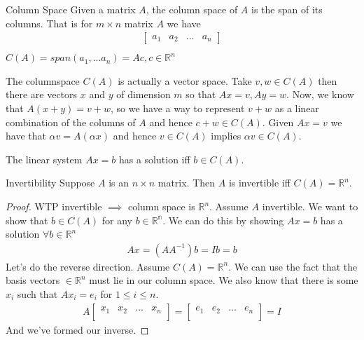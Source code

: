 \documentclass[11pt]{article}
\begin{document}
\begin{definitionbox}{Column Space}
    Given a matrix $A$, the column space of $A$ is the span of its columns. That is for $m \times n$
    matrix $A$ we have
    \begin{align*}
        \begin{bmatrix}
            a_1 & a_2 & ... & a_n
        \end{bmatrix} \\
    \end{align*}
    $C(A)=span({a_1,...a_n})={Ac, c \in \mathbb{R}^n}$
\end{definitionbox}

The columnspace $C(A)$ is actually a vector space. Take $v,w \in C(A)$ then there are vectors $x$
and $y$ of dimension $m$ so that $Ax=v, Ay=w$. Now, we know that $A(x+y)=v+w$, so we have a way to
represent $v+w$ as a linear combination of the columns of $A$ and hence $c+w \in C(A)$. Given
$Ax=v$ we have that $\alpha v = A(\alpha x)$ and hence $v \in C(A)$ implies $\alpha v \in C(A)$.

\begin{theorembox}{}
    The linear system $Ax=b$ has a solution iff $b \in C(A)$.
\end{theorembox}

\begin{theorembox}{Invertibility}
    Suppose $A$ is an $n \times n$ matrix. Then $A$ is invertible iff $C(A) = \mathbb{R}^n$.
\end{theorembox}

\begin{proof}
    WTP invertible $\implies$ column space is $\mathbb{R}^n$. Assume $A$ invertible. We want to show
    that $b \in C(A)$ for any $b \in \mathbb{R^n}$. We can do this by showing $Ax=b$ has a solution
    $\forall b \in \mathbb{R}^n$
    \begin{align*}
        Ax=(AA^{-1})b=Ib=b
    \end{align*}
    Let's do the reverse direction. Assume $C(A) = \mathbb{R}^n$. We can use the fact that the basis
    vectors $\in \mathbb{R}^n$ must lie in our column space. We also know that there is some $x_i$
    such that $Ax_i=e_i$ for $1 \leq i \leq n$.
    \begin{align*}
        A
        \begin{bmatrix}
            x_1 & x_2 & ... & x_n \\   
        \end{bmatrix}
        =
        \begin{bmatrix}
            e_1 & e_2 & ... & e_n \\
        \end{bmatrix}
        = I
    \end{align*}
    And we've formed our inverse.
\end{proof}
\end{document}
